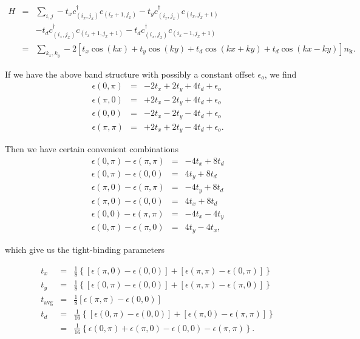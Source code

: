 \documentclass{article}
\theoremstyle{definition}
\begin{document}
\begin{eqnarray}
  H &=& \sum_{i,j} -t_x c^\dag_{(i_x,j_x)} c_{(i_x + 1,j_x)} - t_y c^\dag_{(i_x, j_x)} c_{(i_x, j_x + 1)} \\
  &&- t_d c^\dag_{(i_x, j_x)} c_{(i_x + 1, j_x + 1)} - t_d c^\dag_{(i_x, j_x)} c_{(i_x -1 , j_x + 1)} \\
    &=& \sum_{k_x, k_y} -2 \left[ t_x \cos(kx) + t_y \cos(ky) + t_d \cos(kx+ky) + t_d \cos(kx-ky) \right] n_\mathbf{k}.
\end{eqnarray}

If we have the above band structure with possibly a constant offset $\epsilon_o$, we find
\begin{eqnarray}
\epsilon(0, \pi) &=& -2 t_x + 2 t_y + 4 t_d + \epsilon_o\\
\epsilon(\pi, 0) &=& +2 t_x - 2 t_y + 4 t_d + \epsilon_o\\
\epsilon(0, 0) &=& -2t_x - 2t_y - 4t_d + \epsilon_o\\
\epsilon(\pi, \pi) &=& +2t_x + 2t_y - 4t_d + \epsilon_o.
\end{eqnarray}

Then we have certain convenient combinations
\begin{eqnarray}
\epsilon(0, \pi) - \epsilon(\pi, \pi) &=& -4t_x + 8t_d\\
\epsilon(0, \pi) - \epsilon(0, 0) &=& 4 t_y + 8 t_d\\
\epsilon(\pi, 0) - \epsilon(\pi, \pi) &=& -4t_y + 8t_d\\
\epsilon(\pi, 0) - \epsilon(0, 0) &=& 4t_x + 8 t_d\\
\epsilon(0, 0) - \epsilon(\pi, \pi) &=& -4t_x - 4t_y\\
\epsilon(0, \pi) - \epsilon(\pi, 0) &=& 4t_y - 4t_x,
\end{eqnarray}

which give us the tight-binding parameters

\begin{eqnarray}
  t_x &=& \frac{1}{8} \left\{ \left[ \epsilon(\pi, 0) - \epsilon(0, 0)\right] + \left[\epsilon(\pi, \pi) - \epsilon(0, \pi) \right] \right\}\\
  t_y &=& \frac{1}{8} \left\{ \left[ \epsilon(0, \pi) - \epsilon(0, 0) \right] + \left[\epsilon(\pi, \pi)  - \epsilon(\pi, 0) \right] \right\}\\
  t_\text{avg} &=& \frac{1}{8} \left[ \epsilon(\pi, \pi) - \epsilon(0,0) \right]\\
  t_d &=& \frac{1}{16} \left\{ \left[ \epsilon(0, \pi) - \epsilon(0, 0) \right] + \left[\epsilon(\pi, 0) - \epsilon(\pi, \pi) \right] \right\}\\
  &=& \frac{1}{16} \left\{\epsilon(0, \pi) + \epsilon(\pi, 0) - \epsilon(0, 0) - \epsilon(\pi, \pi) \right\}.
\end{eqnarray}
\end{document}
